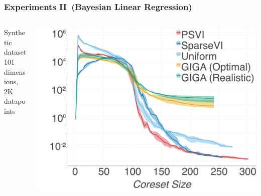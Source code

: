 \documentclass[hyperref={colorlinks = true},unknownkeysallowed]{beamer}
\begin{document}
\begin{frame}
	\frametitle{Experiments II~(Bayesian Linear Regression)}
	\centering
	\begin{columns}
		\begin{column}{.5\textwidth}
		Synthetic dataset
		\\101 dimensions,
		\\2K datapoints
		\end{column}
		\begin{column}{.5\textwidth}
		\includegraphics[width=1.\textwidth]{figs/linregKLDvsCstSize.png}
		\end{column}
	\end{columns}
\end{frame}
\end{document}
